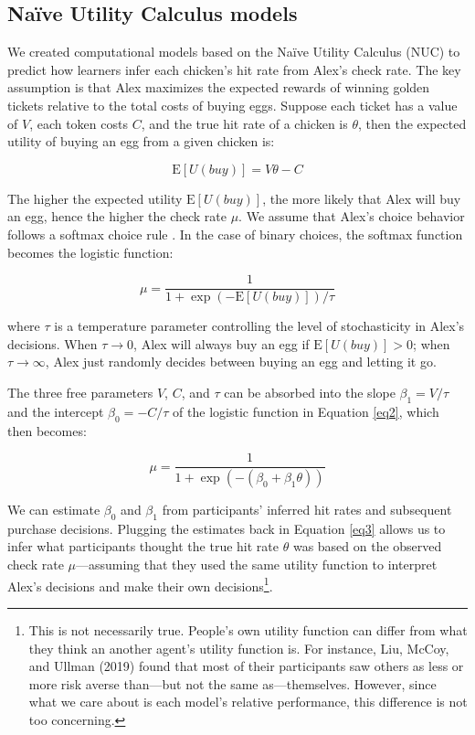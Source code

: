 \documentclass[10pt,letterpaper]{article}
\begin{document}
\subsection{Na\"ive Utility Calculus models}
We created computational models based on the Na\"ive Utility Calculus (NUC) \citep{jara2016naive} to predict how learners infer each chicken's hit rate from Alex's check rate. The key assumption is that Alex maximizes the expected rewards of winning golden tickets relative to the total costs of buying eggs. Suppose each ticket has a value of $V$, each token costs $C$, and the true hit rate of a chicken is $\theta$, then the expected utility of buying an egg from a given chicken is:

\begin{equation} \label{eq1}
\mathrm{E}[U(buy)] = V\theta - C
\end{equation}

The higher the expected utility $\mathrm{E}[U(buy)]$, the more likely that Alex will buy an egg, hence the higher the check rate $\mu$. We assume that Alex's choice behavior follows a softmax choice rule \citep{sutton998}. In the case of binary choices, the softmax function becomes the logistic function:

\begin{equation} \label{eq2}
\mu = \frac{1}{1 + \exp (-\mathrm{E}[U(buy)])/\tau}
\end{equation}

where $\tau$ is a temperature parameter controlling the level of stochasticity in Alex's decisions. When $\tau \to 0$, Alex will always buy an egg if $\mathrm{E}[U(buy)] > 0$; when $\tau \to \infty$, Alex just randomly decides between buying an egg and letting it go. 

The three free parameters $V$, $C$, and $\tau$ can be absorbed into the slope $\beta_1 = V/\tau$ and the intercept $\beta_0 = -C/\tau$ of the logistic function in Equation \ref{eq2}, which then becomes:

\begin{equation} \label{eq3}
\mu = \frac{1}{1 + \exp (-(\beta_0 + \beta_1\theta))}
\end{equation} 

We can estimate $\beta_0$ and $\beta_1$ from participants' inferred hit rates and subsequent purchase decisions. Plugging the estimates back in Equation \ref{eq3} allows us to infer what participants thought the true hit rate $\theta$ was based on the observed check rate $\mu$---assuming that they used the same utility function to interpret Alex's decisions and make their own decisions\footnote{This is not necessarily true. People's own utility function can differ from what they think an another agent's utility function is. For instance, Liu, McCoy, and Ullman (2019) found that most of their participants saw others as less or more risk averse than---but not the same as---themselves. However, since what we care about is each model's relative performance, this difference is not too concerning.}. 
\end{document}

